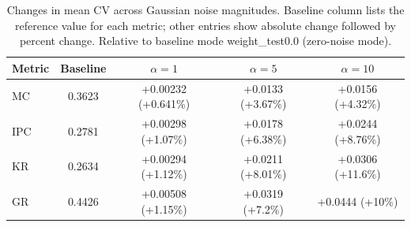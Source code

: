 \begin{table}[t]
\centering
\small
\caption{Changes in mean CV across Gaussian noise magnitudes. Baseline column lists the reference value for each metric; other entries show absolute change followed by percent change. Relative to baseline mode weight\_test0.0 (zero-noise mode).}
\label{tab:weight-gauss-diff-mean-cv}
\begin{tabular}{lcccc}
\toprule
Metric & Baseline & $\alpha=1$ & $\alpha=5$ & $\alpha=10$ \\
\midrule
MC & 0.3623 & +0.00232 (+0.641\%) & +0.0133 (+3.67\%) & +0.0156 (+4.32\%) \\
IPC & 0.2781 & +0.00298 (+1.07\%) & +0.0178 (+6.38\%) & +0.0244 (+8.76\%) \\
KR & 0.2634 & +0.00294 (+1.12\%) & +0.0211 (+8.01\%) & +0.0306 (+11.6\%) \\
GR & 0.4426 & +0.00508 (+1.15\%) & +0.0319 (+7.2\%) & +0.0444 (+10\%) \\
\bottomrule
\end{tabular}
\end{table}

